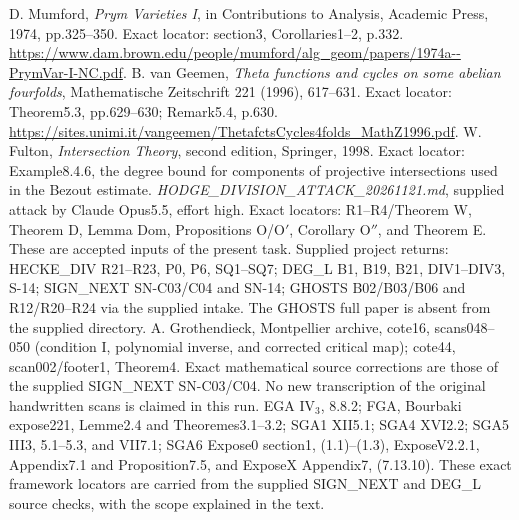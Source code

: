 D. Mumford, \emph{Prym Varieties I}, in Contributions to Analysis,
Academic Press, 1974, pp.325--350. Exact locator: section3,
Corollaries1--2, p.332.
\url{https://www.dam.brown.edu/people/mumford/alg_geom/papers/1974a--PrymVar-I-NC.pdf}.
B. van Geemen, \emph{Theta functions and cycles on some abelian fourfolds},
Mathematische Zeitschrift 221 (1996), 617--631.
Exact locator: Theorem5.3, pp.629--630; Remark5.4, p.630.
\url{https://sites.unimi.it/vangeemen/ThetafctsCycles4folds_MathZ1996.pdf}.
W. Fulton, \emph{Intersection Theory}, second edition, Springer, 1998.
Exact locator: Example8.4.6, the degree bound for components of
projective intersections used in the Bezout estimate.
\emph{HODGE\_DIVISION\_ATTACK\_20261121.md}, supplied attack by
Claude Opus5.5, effort high. Exact locators: R1--R4/Theorem W,
Theorem D, Lemma Dom, Propositions O/O$'$, Corollary O$''$,
and Theorem E. These are accepted inputs of the present task.
Supplied project returns: HECKE\_DIV R21--R23, P0, P6, SQ1--SQ7;
DEG\_L B1, B19, B21, DIV1--DIV3, S-14;
SIGN\_NEXT SN-C03/C04 and SN-14;
GHOSTS B02/B03/B06 and R12/R20--R24 via the supplied intake.
The GHOSTS full paper is absent from the supplied directory.
A. Grothendieck, Montpellier archive, cote16, scans048--050
(condition I, polynomial inverse, and corrected critical map);
cote44, scan002/footer1, Theorem4. Exact mathematical source corrections
are those of the supplied SIGN\_NEXT SN-C03/C04. No new transcription
of the original handwritten scans is claimed in this run.
EGA IV$_3$, 8.8.2; FGA, Bourbaki expose221, Lemme2.4 and
Theoremes3.1--3.2; SGA1 XII5.1; SGA4 XVI2.2;
SGA5 III3, 5.1--5.3, and VII7.1;
SGA6 Expose0 section1, (1.1)--(1.3), ExposeV2.2.1,
Appendix7.1 and Proposition7.5, and ExposeX Appendix7, (7.13.10).
These exact framework locators are carried from the supplied
SIGN\_NEXT and DEG\_L source checks, with the scope explained in the text.
